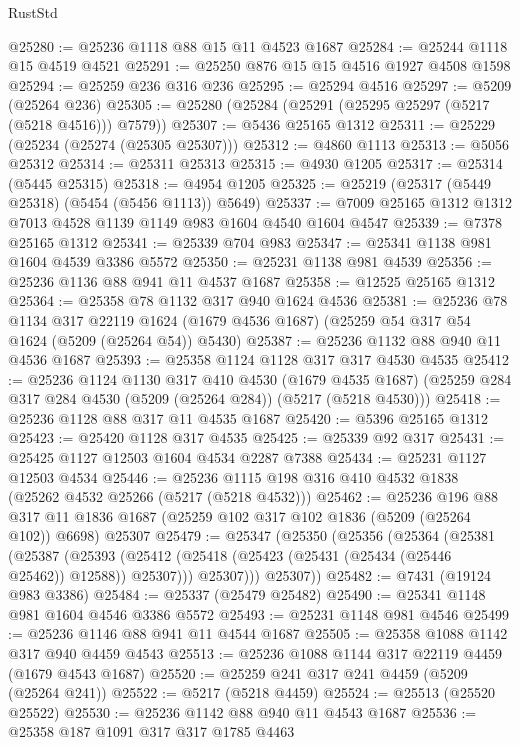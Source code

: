 \begin{lexlean}{RustStd}
\begin{coremodule}
@25280 := @25236 @1118 @88 @15 @11 @4523 @1687
@25284 := @25244 @1118 @15 @4519 @4521
@25291 := @25250 @876 @15 @15 @4516 @1927 @4508 @1598
@25294 := @25259 @236 @316 @236
@25295 := @25294 @4516
@25297 := @5209 (@25264 @236)
@25305 := @25280 (@25284 (@25291 (@25295 @25297 (@5217 (@5218 @4516))) @7579))
@25307 := @5436 @25165 @1312
@25311 := @25229 (@25234 (@25274 (@25305 @25307)))
@25312 := @4860 @1113
@25313 := @5056 @25312
@25314 := @25311 @25313
@25315 := @4930 @1205
@25317 := @25314 (@5445 @25315)
@25318 := @4954 @1205
@25325 := @25219 (@25317 (@5449 @25318) (@5454 (@5456 @1113)) @5649)
@25337 := @7009 @25165 @1312 @1312 @7013 @4528 @1139 @1149 @983 @1604 @4540 @1604 @4547
@25339 := @7378 @25165 @1312
@25341 := @25339 @704 @983
@25347 := @25341 @1138 @981 @1604 @4539 @3386 @5572
@25350 := @25231 @1138 @981 @4539
@25356 := @25236 @1136 @88 @941 @11 @4537 @1687
@25358 := @12525 @25165 @1312
@25364 := @25358 @78 @1132 @317 @940 @1624 @4536
@25381 := @25236
    @78
    @1134
    @317
    @22119
    @1624
    (@1679 @4536 @1687)
    (@25259 @54 @317 @54 @1624 (@5209 (@25264 @54)) @5430)
@25387 := @25236 @1132 @88 @940 @11 @4536 @1687
@25393 := @25358 @1124 @1128 @317 @317 @4530 @4535
@25412 := @25236
    @1124
    @1130
    @317
    @410
    @4530
    (@1679 @4535 @1687)
    (@25259 @284 @317 @284 @4530 (@5209 (@25264 @284)) (@5217 (@5218 @4530)))
@25418 := @25236 @1128 @88 @317 @11 @4535 @1687
@25420 := @5396 @25165 @1312
@25423 := @25420 @1128 @317 @4535
@25425 := @25339 @92 @317
@25431 := @25425 @1127 @12503 @1604 @4534 @2287 @7388
@25434 := @25231 @1127 @12503 @4534
@25446 := @25236 @1115 @198 @316 @410 @4532 @1838 (@25262 @4532 @25266 (@5217 (@5218 @4532)))
@25462 := @25236
    @196
    @88
    @317
    @11
    @1836
    @1687
    (@25259 @102 @317 @102 @1836 (@5209 (@25264 @102)) @6698)
    @25307
@25479 := @25347
    (@25350
      (@25356
        (@25364
          (@25381
            (@25387
              (@25393 (@25412 (@25418 (@25423 (@25431 (@25434 (@25446 @25462)) @12588)) @25307)))
              @25307)))
        @25307))
@25482 := @7431 (@19124 @983 @3386)
@25484 := @25337 (@25479 @25482)
@25490 := @25341 @1148 @981 @1604 @4546 @3386 @5572
@25493 := @25231 @1148 @981 @4546
@25499 := @25236 @1146 @88 @941 @11 @4544 @1687
@25505 := @25358 @1088 @1142 @317 @940 @4459 @4543
@25513 := @25236 @1088 @1144 @317 @22119 @4459 (@1679 @4543 @1687)
@25520 := @25259 @241 @317 @241 @4459 (@5209 (@25264 @241))
@25522 := @5217 (@5218 @4459)
@25524 := @25513 (@25520 @25522)
@25530 := @25236 @1142 @88 @940 @11 @4543 @1687
@25536 := @25358 @187 @1091 @317 @317 @1785 @4463

\end{coremodule}
\end{lexlean}
